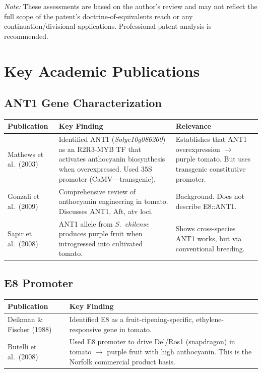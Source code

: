 \documentclass[12pt,a4paper]{article}
\begin{document}
\noindent\textit{Note:} These assessments are based on the author's review and may not reflect the full scope of the patent's doctrine-of-equivalents reach or any continuation/divisional applications. Professional patent analysis is recommended.

\section{Key Academic Publications}

\subsection{ANT1 Gene Characterization}

\begin{longtable}{p{3.5cm} p{4.5cm} p{5cm}}
\toprule
\textbf{Publication} & \textbf{Key Finding} & \textbf{Relevance} \\
\midrule
\endhead
Mathews et al.\ (2003) & Identified ANT1 (\textit{Solyc10g086260}) as an R2R3-MYB TF that activates anthocyanin biosynthesis when overexpressed. Used 35S promoter (CaMV---transgenic). & Establishes that ANT1 overexpression $\rightarrow$ purple tomato. But uses transgenic constitutive promoter. \\
\addlinespace
Gonzali et al.\ (2009) & Comprehensive review of anthocyanin engineering in tomato. Discusses ANT1, Aft, atv loci. & Background. Does not describe E8::ANT1. \\
\addlinespace
Sapir et al.\ (2008) & ANT1 allele from \textit{S.~chilense} produces purple fruit when introgressed into cultivated tomato. & Shows cross-species ANT1 works, but via conventional breeding. \\
\bottomrule
\end{longtable}

\subsection{E8 Promoter}

\begin{longtable}{p{3.5cm} p{9.5cm}}
\toprule
\textbf{Publication} & \textbf{Key Finding} \\
\midrule
\endhead
Deikman \& Fischer (1988) & Identified E8 as a fruit-ripening-specific, ethylene-responsive gene in tomato. \\
\addlinespace
Butelli et al.\ (2008) & Used E8 promoter to drive Del/Ros1 (snapdragon) in tomato $\rightarrow$ purple fruit with high anthocyanin. This is the Norfolk commercial product basis. \\
\bottomrule
\end{longtable}
\end{document}

